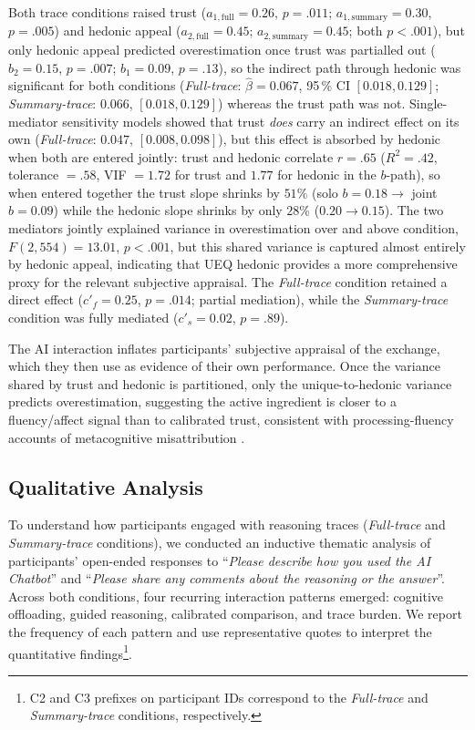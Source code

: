 \documentclass[manuscript, anonymous=false,authorversion,review=false]{acmart}
\begin{document}
Both trace conditions raised trust ($a_{1,\text{full}} = 0.26$, $p = .011$; $a_{1,\text{summary}} = 0.30$, $p = .005$) and hedonic appeal ($a_{2,\text{full}} = 0.45$; $a_{2,\text{summary}} = 0.45$; both $p < .001$), but only hedonic appeal predicted overestimation once trust was partialled out ($b_{2} = 0.15$, $p = .007$; $b_{1} = 0.09$, $p = .13$), so the indirect path through hedonic was significant for both conditions (\textit{Full-trace}: $\hat{\beta} = 0.067$, 95\,\% CI $[0.018, 0.129]$; \textit{Summary-trace}: $0.066$, $[0.018, 0.129]$) whereas the trust path was not. Single-mediator sensitivity models showed that trust \emph{does} carry an indirect effect on its own (\textit{Full-trace}: $0.047$, $[0.008, 0.098]$), but this effect is absorbed by hedonic when both are entered jointly: trust and hedonic correlate $r = .65$ ($R^{2} = .42$, tolerance $= .58$, VIF $= 1.72$ for trust and $1.77$ for hedonic in the $b$-path), so when entered together the trust slope shrinks by $51\%$ (solo $b = 0.18 \to$ joint $b = 0.09$) while the hedonic slope shrinks by only $28\%$ ($0.20 \to 0.15$). The two mediators jointly explained variance in overestimation over and above condition, $F(2, 554) = 13.01$, $p < .001$, but this shared variance is captured almost entirely by hedonic appeal, indicating that UEQ hedonic provides a more comprehensive proxy for the relevant subjective appraisal. The \textit{Full-trace} condition retained a direct effect ($c'_{f} = 0.25$, $p = .014$; partial mediation), while the \textit{Summary-trace} condition was fully mediated ($c'_{s} = 0.02$, $p = .89$).

The AI interaction inflates participants' subjective appraisal of the exchange, which they then use as evidence of their own performance. Once the variance shared by trust and hedonic is partitioned, only the unique-to-hedonic variance predicts overestimation, suggesting the active ingredient is closer to a fluency/affect signal than to calibrated trust, consistent with processing-fluency accounts of metacognitive misattribution \cite{alter2009uniting}.


\subsection{Qualitative Analysis}



To understand how participants engaged with reasoning traces (\textit{Full-trace} and \textit{Summary-trace} conditions), we conducted an inductive thematic analysis \cite{clarke2017thematic} of participants' open-ended responses to ``\textit{Please describe how you used the AI Chatbot}'' and ``\textit{Please share any comments about the reasoning or the answer}''. Across both conditions, four recurring interaction patterns emerged: cognitive offloading, guided reasoning, calibrated comparison, and trace burden. We report the frequency of each pattern and use representative quotes to interpret the quantitative findings\footnote{ C2 and C3 prefixes on participant IDs correspond to the \textit{Full-trace} and \textit{Summary-trace} conditions, respectively.}.
\end{document}
